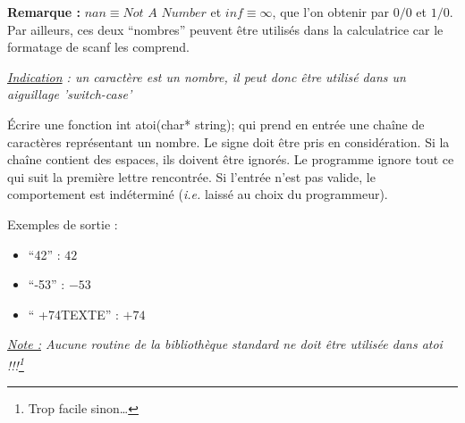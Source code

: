 \documentclass[../../../main.tex]{subfiles}
\begin{document}
\textbf{Remarque : } $nan\equiv{\textit{Not A Number}}$ et $inf\equiv{\infty}$, que l'on obtenir par $0/0$ et $1/0$. Par ailleurs, ces deux ``nombres'' peuvent être utilisés dans la calculatrice car le formatage de \textsf{scanf} les comprend.
 
\textit{\underline{Indication} : un caractère est un nombre, il peut donc être utilisé dans un aiguillage 'switch-case'}

Écrire une fonction \textsf{int atoi(char* string);} qui prend en entrée une chaîne de caractères représentant un nombre. Le signe doit être pris en considération. Si la chaîne contient des espaces, ils doivent être ignorés. Le programme ignore tout ce qui suit la première lettre rencontrée.\newline
Si l'entrée n'est pas valide, le comportement est indéterminé (\textit{i.e.} laissé au choix du programmeur).

Exemples de sortie :
\begin{itemize}
	\item ``42'' : $42$
	\item ``-53'' : $-53$
	\item `` +74TEXTE'' : $+74$
\end{itemize}
\textit{\underline{Note :} Aucune routine de la bibliothèque standard ne doit être utilisée dans \textsf{atoi} !!!\footnote{Trop facile sinon\dots}}
\end{document}
